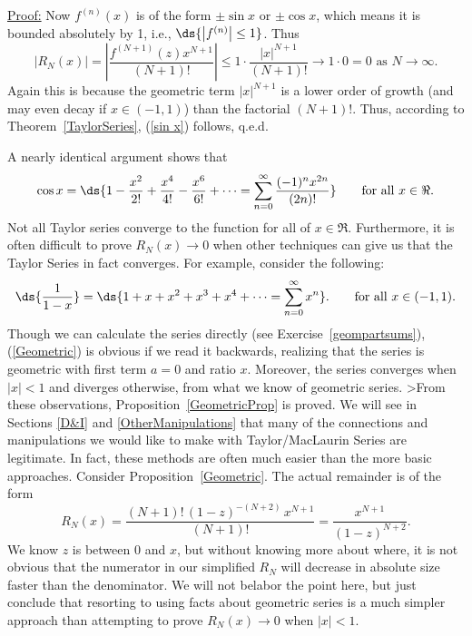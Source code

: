 \underline{Proof:}
Now $f^{(n)}(x)$ is of the form $\pm\sin x$ or $\pm\cos x$, which
means it is bounded absolutely by 1, i.e.,
$\ds{\left|f^{(n)}\right|\le1}$.
Thus
$$|R_N(x)|=\left|\frac{f^{(N+1)}(z)x^{N+1}}{(N+1)!}\right|
\le 1\cdot\frac{|x|^{N+1}}{(N+1)!}\to1\cdot0=0
\text{ as }N\to\infty.$$
Again this is because the geometric term $|x|^{N+1}$ is
a lower order of growth (and may even decay if $x\in(-1,1)$)
than the factorial $(N+1)!$. 
Thus, according to Theorem~\ref{TaylorSeries}, (\ref{sin x})
follows, q.e.d.

A nearly identical argument shows that
\bprop \begin{equation}
\cos x=\ds{1-\frac{x^2}{2!}+\frac{x^4}{4!}-\frac{x^6}{6!}+\cdots
        =\sum_{n=0}^\infty\frac{(-1)^{n}x^{2n}}{(2n)!}}
\qquad\text{for all }x\in\Re.\label{cos x}
\end{equation}
\eprop
Not all Taylor series converge to the function
for all of $x\in\Re$.  Furthermore,
it is often difficult to prove $R_N(x)\to0$ when other techniques
can give us that the Taylor Series in fact converges.  For example,
consider the following:
\bprop
\begin{equation}
\ds{\frac1{1-x}}=\ds{1+x+x^2+x^3+x^4+\cdots
	=\sum_{n=0}^\infty x^n}.
\qquad\text{for all }x\in(-1,1).\label{Geometric}\end{equation} 
\label{GeometricProp}\eprop
Though we can calculate the series directly
(see  Exercise~\ref{geompartsums}), 
(\ref{Geometric}) is obvious if we read it backwards,
realizing that the series is geometric with
first term $a=0$ and ratio $x$.
Moreover, the series converges when $|x|<1$ and diverges
otherwise, from what we know of geometric series.
>From these observations, Proposition~\ref{GeometricProp}
is proved.
We will see in Sections \ref{D&I} and \ref{OtherManipulations}
that many of the connections and manipulations we would like
to make with Taylor/MacLaurin Series are legitimate.
In fact, these methods are often much easier than the
more basic approaches.  Consider Proposition~\ref{Geometric}. 
The actual remainder is of the form
\begin{equation}
R_N(x)=\frac{(N+1)!\,(1-z)^{-(N+2)}\,x^{N+1}}{(N+1)!}
=\frac{x^{N+1}}{(1-z)^{N+2}}.\label{GeometricRemainder}\end{equation} 
We know $z$ is between $0$ and $x$, but without knowing 
more about where,
it is not obvious that the numerator in our simplified
$R_N$ will decrease in absolute size faster than the denominator.
We will not belabor the point here, but just conclude that
resorting to using facts about geometric series is a
much simpler approach than attempting to prove $R_N(x)\to0$
when $|x|<1$.

